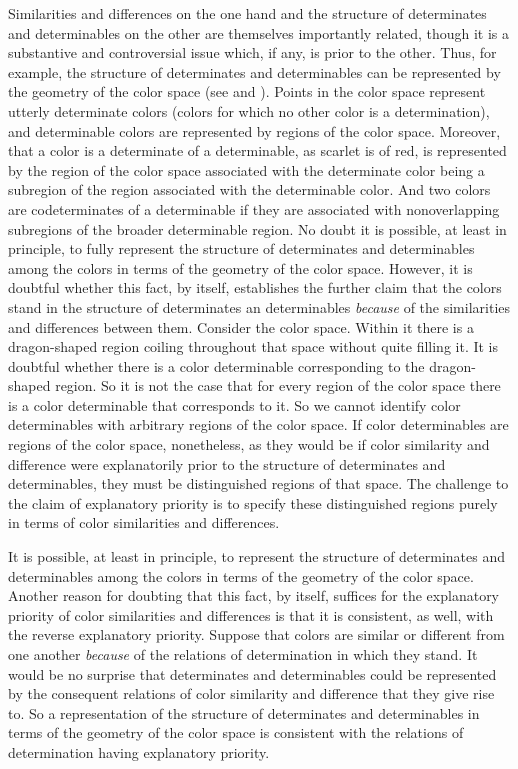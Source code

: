 \documentclass[12pt]{article}
\begin{document}
Similarities and differences on the one hand and the structure of determinates and determinables on the other are themselves importantly related, though it is a substantive and controversial issue which, if any, is prior to the other. Thus, for example, the structure of determinates and determinables can be represented by the geometry of the color space (see \citealt{Hilbert:2000on} and \citealt{Funkhouser:2006as}). Points in the color space represent utterly determinate colors (colors for which no other color is a determination), and determinable colors are represented by regions of the color space. Moreover, that a color is a determinate of a determinable, as scarlet is of red, is represented by the region of the color space associated with the determinate color being a subregion of the region associated with the determinable color. And two colors are codeterminates of a determinable if they are associated with nonoverlapping subregions of the broader determinable region. No doubt it is possible, at least in principle, to fully represent the structure of determinates and determinables among the colors in terms of the geometry of the color space. However, it is doubtful whether this fact, by itself, establishes the further claim that the colors stand in the structure of determinates an determinables \emph{because} of the similarities and differences between them. Consider the color space. Within it there is a dragon-shaped region coiling throughout that space without quite filling it. It is doubtful whether there is a color determinable corresponding to the dragon-shaped region. So it is not the case that for every region of the color space there is a color determinable that corresponds to it. So we cannot identify color determinables with arbitrary regions of the color space. If color determinables are regions of the color space, nonetheless, as they would be if color similarity and difference were explanatorily prior to the structure of determinates and determinables, they must be distinguished regions of that space. The challenge to the claim of explanatory priority is to specify these distinguished regions purely in terms of color similarities and differences. 

It is possible, at least in principle, to represent the structure of determinates and determinables among the colors in terms of the geometry of the color space. Another reason for doubting that this fact, by itself, suffices for the explanatory priority of color similarities and differences is that it is consistent, as well, with the reverse explanatory priority. Suppose that colors are similar or different from one another \emph{because} of the relations of determination in which they stand. It would be no surprise that determinates and determinables could be represented by the consequent relations of color similarity and difference that they give rise to. So a representation of the structure of determinates and determinables in terms of the geometry of the color space is consistent with the relations of determination having explanatory priority.
\end{document}
